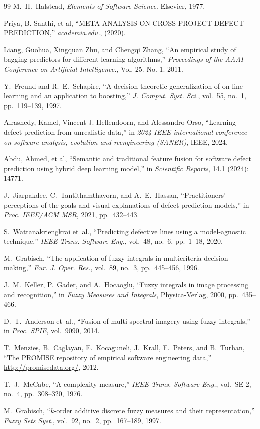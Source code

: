 \documentclass[10pt,twocolumn]{article}
\begin{document}
\begin{thebibliography}{99}
M.~H.~Halstead, \emph{Elements of Software Science}. Elsevier, 1977.

Priya, B. Santhi, et al, ``META ANALYSIS ON CROSS PROJECT DEFECT PREDICTION,'' \emph{academia.edu.},
(2020).

Liang, Guohua, Xingquan Zhu, and Chengqi Zhang, ``An empirical study of bagging predictors for different learning algorithms,'' \emph{Proceedings of the AAAI Conference on Artificial Intelligence.}, Vol. 25. No. 1. 2011.

Y.~Freund and R.~E.~Schapire, ``A decision-theoretic generalization of on-line learning
and an application to boosting,'' \emph{J. Comput. Syst. Sci.}, vol.~55, no.~1,
pp.~119--139, 1997.

Alrashedy, Kamel, Vincent J. Hellendoorn, and Alessandro Orso, ``Learning defect prediction from unrealistic data,''
in \emph{2024 IEEE international conference on software analysis, evolution and reengineering (SANER)}, IEEE, 2024.

Abdu, Ahmed, et al, ``Semantic and traditional feature fusion for software defect prediction using hybrid deep learning model,''
in \emph{Scientific Reports}, 14.1 (2024): 14771.

J.~Jiarpakdee, C.~Tantithamthavorn, and A.~E.~Hassan,
``Practitioners' perceptions of the goals and visual explanations of defect prediction models,''
in \emph{Proc. IEEE/ACM MSR}, 2021, pp.~432--443.

S.~Wattanakriengkrai et~al., ``Predicting defective lines using a model-agnostic technique,''
\emph{IEEE Trans. Software Eng.}, vol.~48, no.~6, pp.~1--18, 2020.

M.~Grabisch, ``The application of fuzzy integrals in multicriteria decision making,''
\emph{Eur. J. Oper. Res.}, vol.~89, no.~3, pp.~445--456, 1996.

J.~M.~Keller, P.~Gader, and A.~Hocaoglu, ``Fuzzy integrals in image processing and
recognition,'' in \emph{Fuzzy Measures and Integrals}, Physica-Verlag, 2000, pp.~435--466.

D.~T.~Anderson et~al., ``Fusion of multi-spectral imagery using fuzzy integrals,''
in \emph{Proc. SPIE}, vol.~9090, 2014.

T.~Menzies, B.~Caglayan, E.~Kocaguneli, J.~Krall, F.~Peters, and B.~Turhan,
``The PROMISE repository of empirical software engineering data,''
\url{http://promisedata.org/}, 2012.

T.~J.~McCabe, ``A complexity measure,'' \emph{IEEE Trans. Software Eng.},
vol.~SE-2, no.~4, pp.~308--320, 1976.

M.~Grabisch, ``$k$-order additive discrete fuzzy measures and their representation,''
\emph{Fuzzy Sets Syst.}, vol.~92, no.~2, pp.~167--189, 1997.

\end{thebibliography}
\end{document}
